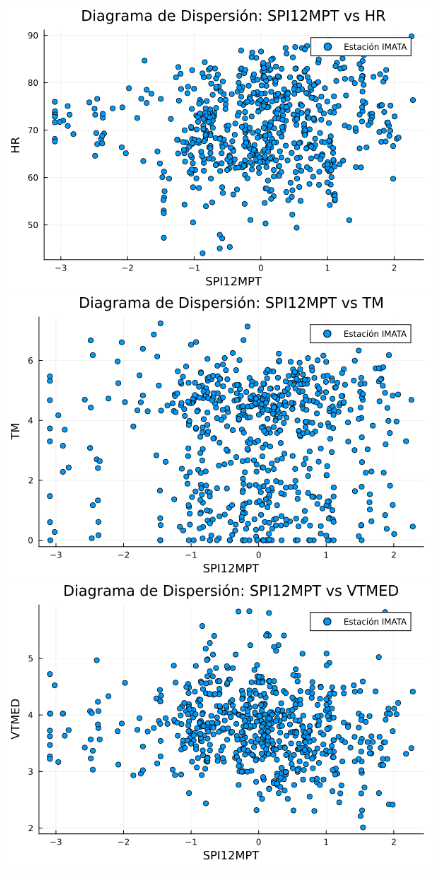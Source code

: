 \begin{figure}[htbp]
\begin{minipage}{0.32\textwidth}
    \centering
    \includegraphics[width=\linewidth]{Capitulos/Scaterplot/IMATA_SPI12MPT_vs_HR.png}
\end{minipage}\hfill
\begin{minipage}{0.32\textwidth}
    \centering
    \includegraphics[width=\linewidth]{Capitulos/Scaterplot/IMATA_SPI12MPT_vs_TM.png}
\end{minipage}\hfill
\begin{minipage}{0.32\textwidth}
    \centering
    \includegraphics[width=\linewidth]{Capitulos/Scaterplot/IMATA_SPI12MPT_vs_VTMED.png}
\end{minipage}


\end{figure}
